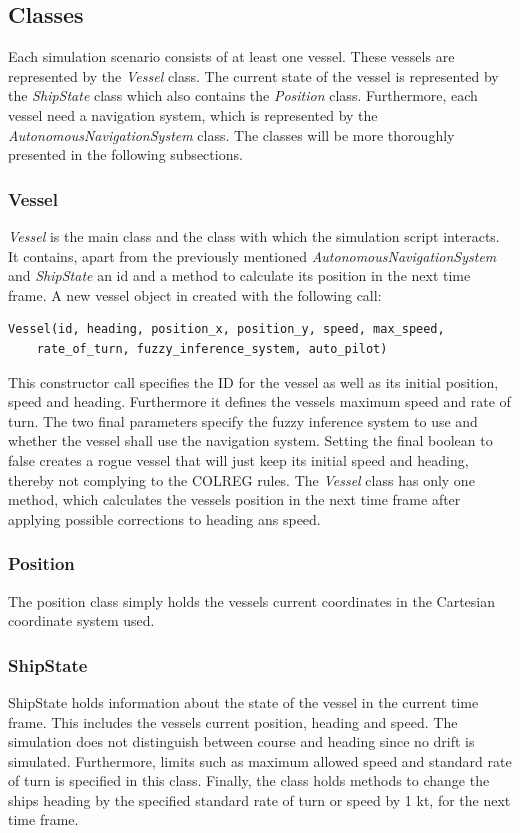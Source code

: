 \subsection{Classes}
Each simulation scenario consists of at least one vessel. These vessels are represented by the \textit{Vessel} class. The current state of the vessel is represented by the \textit{ShipState} class which also contains the \textit{Position} class. Furthermore, each vessel need a navigation system, which is represented by the \textit{AutonomousNavigationSystem} class. The classes will be more thoroughly presented in the following subsections.
\subsubsection{Vessel}
\textit{Vessel} is the main class and the class with which the simulation script interacts.
It contains, apart from the previously mentioned \textit{AutonomousNavigationSystem} and \textit{ShipState} an id and a method to calculate its position in the next time frame.
A new vessel object in created with the following call:
\begin{verbatim}
Vessel(id, heading, position_x, position_y, speed, max_speed, 
    rate_of_turn, fuzzy_inference_system, auto_pilot)
\end{verbatim}
This constructor call specifies the ID for the vessel as well as its initial position, speed and heading. Furthermore it defines the vessels maximum speed and rate of turn. The two final parameters specify the fuzzy inference system to use and whether the vessel shall use the navigation system. Setting the final boolean to false creates a rogue vessel that will just keep its initial speed and heading, thereby not complying to the COLREG rules. The \textit{Vessel} class has only one method, which calculates the vessels position in the next time frame after applying possible corrections to heading ans speed.
\subsubsection{Position}
The position class simply holds the vessels current coordinates in the Cartesian coordinate system used.
\subsubsection{ShipState}
ShipState holds information about the state of the vessel in the current time frame. This includes the vessels current position, heading and speed. The simulation does not distinguish between course and heading since no drift is simulated.
Furthermore, limits such as maximum allowed speed and standard rate of turn is specified in this class. Finally, the class holds methods to change the ships heading by the specified standard rate of turn or speed by 1 kt, for the next time frame.


